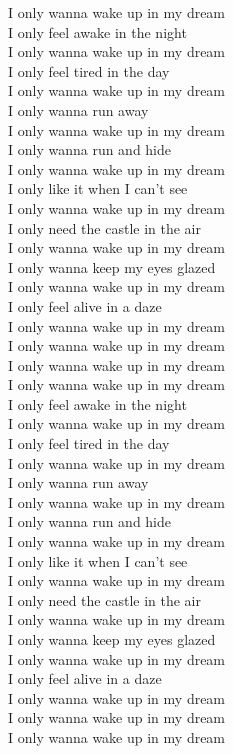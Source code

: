 I only wanna wake up in my dream \\
I only feel awake in the night \\
I only wanna wake up in my dream \\
I only feel tired in the day \\
I only wanna wake up in my dream \\
I only wanna run away \\
I only wanna wake up in my dream \\
I only wanna run and hide \\
I only wanna wake up in my dream \\
I only like it when I can't see \\
I only wanna wake up in my dream \\
I only need the castle in the air \\
I only wanna wake up in my dream \\
I only wanna keep my eyes glazed \\
I only wanna wake up in my dream \\
I only feel alive in a daze \\
I only wanna wake up in my dream \\
I only wanna wake up in my dream \\
I only wanna wake up in my dream \\

I only wanna wake up in my dream \\
I only feel awake in the night \\
I only wanna wake up in my dream \\
I only feel tired in the day \\
I only wanna wake up in my dream \\
I only wanna run away \\
I only wanna wake up in my dream \\
I only wanna run and hide \\
I only wanna wake up in my dream \\
I only like it when I can't see \\
I only wanna wake up in my dream \\
I only need the castle in the air \\
I only wanna wake up in my dream \\
I only wanna keep my eyes glazed \\
I only wanna wake up in my dream \\
I only feel alive in a daze \\
I only wanna wake up in my dream \\
I only wanna wake up in my dream \\
I only wanna wake up in my dream \\

